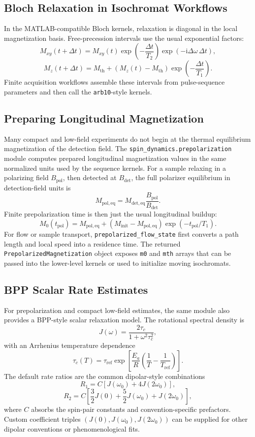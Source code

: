 \documentclass[11pt,oneside]{report}
\newcommand{\code}[1]{\texttt{#1}}
\newcommand{\ii}{\mathrm{i}}
\begin{document}
\subsection{Bloch Relaxation in Isochromat Workflows}

In the MATLAB-compatible Bloch kernels, relaxation is diagonal in the local
magnetization basis. Free-precession intervals use the usual exponential
factors:
\[
  M_{xy}(t+\Delta t) =
    M_{xy}(t)\exp\left(-\frac{\Delta t}{T_2}\right)
    \exp(-\ii \Delta\omega\,\Delta t),
\]
\[
  M_z(t+\Delta t) =
    M_{\mathrm{th}} +
    \left(M_z(t)-M_{\mathrm{th}}\right)
    \exp\left(-\frac{\Delta t}{T_1}\right).
\]
Finite acquisition workflows assemble these intervals from pulse-sequence
parameters and then call the \code{arb10}-style kernels.

\subsection{Preparing Longitudinal Magnetization}

Many compact and low-field experiments do not begin at the thermal equilibrium
magnetization of the detection field. The \code{spin\_dynamics.prepolarization}
module computes prepared longitudinal magnetization values in the same
normalized units used by the sequence kernels. For a sample relaxing in a
polarizing field \(B_{\mathrm{pol}}\), then detected at \(B_{\mathrm{det}}\),
the full polarizer equilibrium in detection-field units is
\[
  M_{\mathrm{pol,eq}} =
    M_{\mathrm{det,eq}}\frac{B_{\mathrm{pol}}}{B_{\mathrm{det}}}.
\]
Finite prepolarization time is then just the usual longitudinal buildup:
\[
  M_0(t_{\mathrm{pol}}) =
    M_{\mathrm{pol,eq}} +
    \left(M_{\mathrm{init}}-M_{\mathrm{pol,eq}}\right)
    \exp\left(-t_{\mathrm{pol}}/T_1\right).
\]
For flow or sample transport, \code{prepolarized\_flow\_state} first converts a
path length and local speed into a residence time. The returned
\code{PrepolarizedMagnetization} object exposes \code{m0} and \code{mth} arrays
that can be passed into the lower-level kernels or used to initialize moving
isochromats.

\subsection{BPP Scalar Rate Estimates}

For prepolarization and compact low-field estimates, the same module also
provides a BPP-style scalar relaxation model. The rotational spectral density is
\[
  J(\omega) = \frac{2\tau_c}{1+\omega^2\tau_c^2},
\]
with an Arrhenius temperature dependence
\[
  \tau_c(T) =
    \tau_{\mathrm{ref}}
    \exp\left[
      \frac{E_a}{R}\left(\frac{1}{T}
      - \frac{1}{T_{\mathrm{ref}}}\right)
    \right].
\]
The default rate ratios are the common dipolar-style combinations
\[
  R_1 = C\left[J(\omega_0)+4J(2\omega_0)\right],
\]
\[
  R_2 = C\left[\frac{3}{2}J(0)
      +\frac{5}{2}J(\omega_0)+J(2\omega_0)\right],
\]
where \(C\) absorbs the spin-pair constants and convention-specific prefactors.
Custom coefficient triples \((J(0),J(\omega_0),J(2\omega_0))\) can be supplied
for other dipolar conventions or phenomenological fits.
\end{document}
